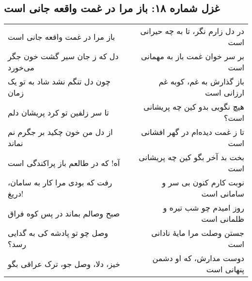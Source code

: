 \begin{center}
\section*{غزل شماره ۱۸: باز مرا در غمت واقعه جانی است}
\label{sec:018}
\begin{longtable}{l p{0.5cm} r}
باز مرا در غمت واقعه جانی است
&&
در دل زارم نگر، تا به چه حیرانی است
\\
دل که ز جان سیر گشت خون جگر می‌خورد
&&
بر سر خوان غمت باز به مهمانی است
\\
چون دل تنگم نشد شاد به تو یک زمان
&&
باز گذارش به غم، کوبه غم ارزانی است
\\
تا سر زلفین تو کرد پریشان دلم
&&
هیچ نگویی بدو کین چه پریشانی است؟
\\
از دل من خون چکید بر جگرم نم نماند
&&
تا ز غمت دیده‌ام در گهر افشانی است
\\
آه! که در طالعم باز پراکندگی است
&&
بخت بد آخر بگو کین چه پریشانی است
\\
رفت که بودی مرا کار به سامان، دریغ!
&&
نوبت کارم کنون بی سر و سامانی است
\\
صبح وصالم بماند در پس کوه فراق
&&
روز امیدم چو شب تیره و ظلمانی است
\\
وصل چو تو پادشه کی به گدایی رسد؟
&&
جستن وصلت مرا مایهٔ نادانی است
\\
خیز، دلا، وصل جو، ترک عراقی بگو
&&
دوست مدارش، که او دشمن پنهانی است
\\
\end{longtable}
\end{center}
